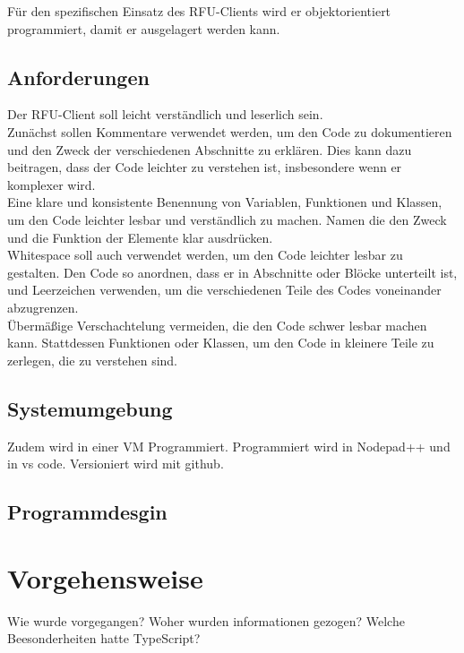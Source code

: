 Für den spezifischen Einsatz des RFU-Clients wird er objektorientiert programmiert, damit er ausgelagert werden kann.\\

\subsection{Anforderungen}


Der RFU-Client soll leicht verständlich und leserlich sein.\\

Zunächst sollen Kommentare verwendet werden, um den Code zu dokumentieren und den Zweck der verschiedenen Abschnitte zu erklären. Dies kann dazu beitragen, dass der Code leichter zu verstehen ist, insbesondere wenn er komplexer wird.\\

Eine klare und konsistente Benennung von Variablen, Funktionen und Klassen, um den Code leichter lesbar und verständlich zu machen. Namen die den Zweck und die Funktion der Elemente klar ausdrücken.\\

Whitespace soll auch verwendet werden, um den Code leichter lesbar zu gestalten. Den Code so anordnen, dass er in Abschnitte oder Blöcke unterteilt ist, und Leerzeichen verwenden, um die verschiedenen Teile des Codes voneinander abzugrenzen.\\

Übermäßige Verschachtelung vermeiden, die den Code schwer lesbar machen kann. Stattdessen Funktionen oder Klassen, um den Code in kleinere Teile zu zerlegen, die zu verstehen sind.\\

\subsection{Systemumgebung}
Zudem wird in einer VM Programmiert. Programmiert wird in Nodepad++ und in vs code. Versioniert wird mit github.

\subsection{Programmdesgin}


\section{Vorgehensweise}
Wie wurde vorgegangen?
Woher wurden informationen gezogen?
Welche Beesonderheiten hatte TypeScript?


